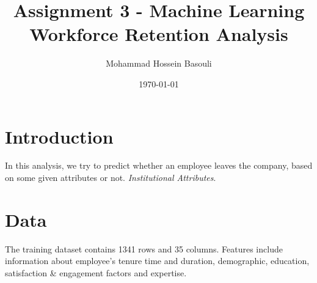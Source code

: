 \documentclass[a4paper,12pt]{article}
\begin{document}
\title{Assignment 3 - Machine Learning \\
Workforce Retention Analysis}
\author{Mohammad Hossein Basouli}
\date{\today}
\maketitle

\section{Introduction}
In this analysis, we try to predict whether an employee leaves the company, based on some given attributes or not.
\textit{Institutional Attributes}. 


\section{Data}
The training dataset contains 1341 rows and 35 columns. Features include information about employee's tenure time and duration, demographic, education, satisfaction \& engagement factors and expertise. 
\end{document}
